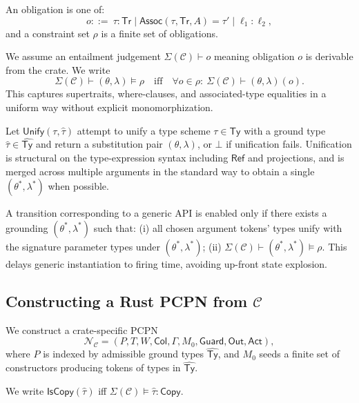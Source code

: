 \documentclass[sigconf]{acmart}
\begin{document}
An obligation is one of:
\begin{equation*}
    o ::=~ \tau:\mathsf{Tr}
\mid \mathsf{Assoc}(\tau,\mathsf{Tr},A)=\tau'
\mid \ell_1:\ell_2,
\end{equation*}
and a constraint set $\rho$ is a finite set of obligations.

We assume an entailment judgement $\Sigma(\mathcal{C})\vdash o$ meaning obligation $o$ is derivable from the crate.
We write
\begin{equation*}
    \Sigma(\mathcal{C})\vdash (\theta,\lambda)\models \rho
\quad\text{iff}\quad
\forall o\in \rho:\ \Sigma(\mathcal{C})\vdash (\theta,\lambda)(o).
\end{equation*}
This captures supertraits, where-clauses, and associated-type equalities in a uniform way
without explicit monomorphization.

Let $\mathsf{Unify}(\tau,\hat\tau)$ attempt to unify a type scheme $\tau\in\mathsf{Ty}$
with a ground type $\hat\tau\in\widehat{\mathsf{Ty}}$ and return a substitution pair $(\theta,\lambda)$, or $\bot$ if unification fails. Unification is structural on the type-expression syntax including $\mathsf{Ref}$ and projections, and is merged across multiple arguments in the standard way to obtain a single $(\theta^{*},\lambda^{*})$ when possible.

A transition corresponding to a generic API is enabled only if there exists a grounding
$(\theta^{*},\lambda^{*})$ such that:
(i) all chosen argument tokens' types unify with the signature parameter types under $(\theta^{*},\lambda^{*})$;
(ii) $\Sigma(\mathcal{C})\vdash (\theta^{*},\lambda^{*})\models \rho$.
This delays generic instantiation to firing time, avoiding up-front state explosion.


\subsection{Constructing a Rust PCPN from $\mathcal{C}$}
\label{sec:method:construct}

We construct a crate-specific PCPN
\begin{equation*}
    \mathcal{N}_{\mathcal{C}}=(P,T,W,\mathsf{Col},\Gamma,M_0,\mathsf{Guard},\mathsf{Out},\mathsf{Act}),
\end{equation*}
where $P$ is indexed by admissible ground types $\widehat{\mathsf{Ty}}$, and $M_0$ seeds a finite set of constructors producing tokens of types in $\widehat{\mathsf{Ty}}$.

We write $\mathsf{IsCopy}(\hat\tau)$ iff $\Sigma(\mathcal{C})\models \hat\tau:\mathsf{Copy}$.
\end{document}
